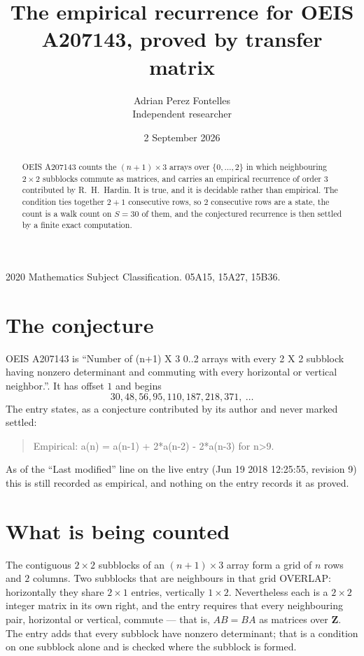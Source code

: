 \documentclass[11pt,a4paper]{article}
\title{The empirical recurrence for OEIS A207143, proved by transfer matrix}
\author{Adrian Perez Fontelles\\ \small Independent researcher}
\date{2 September 2026}
\theoremstyle{plain}
\theoremstyle{definition}
\begin{document}
\maketitle

\begin{abstract}
OEIS A207143 counts the $(n+1)\times3$ arrays over $\{0,\dots,2\}$ in which
neighbouring $2\times2$ subblocks commute as matrices, and carries an empirical recurrence
of order $3$ contributed by R.~H.~Hardin. It is true, and it is decidable rather than
empirical. The condition ties together $2+1$ consecutive rows, so $2$ consecutive rows are
a state, the count is a walk count on $S=30$ of them, and the conjectured recurrence is then
settled by a finite exact computation.
\end{abstract}

\noindent\small 2020 Mathematics Subject Classification. 05A15, 15A27, 15B36.\normalsize

\section{The conjecture}

OEIS A207143 is ``Number of (n+1) X 3 0..2 arrays with every 2 X 2 subblock having nonzero determinant and commuting with every horizontal or vertical neighbor.''. It has offset $1$ and begins
\[
30, 48, 56, 95, 110, 187, 218, 371,\ \dots
\]
The entry states, as a conjecture contributed by its author and never marked settled:
\begin{quote}
Empirical: a(n) = a(n-1) + 2*a(n-2) - 2*a(n-3) for n>9.
\end{quote}
As of the ``Last modified'' line on the live entry (Jun 19 2018 12:25:55, revision 9) this is still
recorded as empirical, and nothing on the entry records it as proved.

\section{What is being counted}

The contiguous $2\times2$ subblocks of an $(n+1)\times3$ array form a grid of $n$
rows and $2$ columns. Two subblocks that are neighbours in that
grid OVERLAP: horizontally they share $2\times1$ entries, vertically
$1\times2$. Nevertheless each is a $2\times2$ integer matrix in its own right, and
the entry requires that every neighbouring pair, horizontal or vertical, commute --- that is,
$AB=BA$ as matrices over $\mathbf{Z}$. The entry adds that every subblock have nonzero determinant; that is a condition on one subblock alone and is checked where the subblock is formed.
\end{document}
